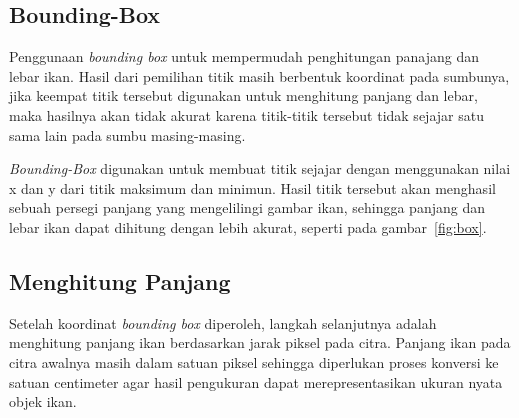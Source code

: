 
\subsection{Bounding-Box}
    Penggunaan \emph{bounding box} untuk mempermudah penghitungan panajang dan lebar ikan. Hasil dari pemilihan titik masih berbentuk koordinat pada sumbunya, 
jika keempat titik tersebut digunakan untuk menghitung panjang dan lebar, maka hasilnya akan tidak akurat karena titik-titik tersebut tidak sejajar satu sama lain pada sumbu masing-masing.

    \emph{Bounding-Box} digunakan untuk membuat titik  sejajar dengan menggunakan nilai x dan y dari titik maksimum dan minimun. Hasil titik tersebut akan menghasil sebuah persegi panjang yang mengelilingi gambar ikan, 
sehingga panjang dan lebar ikan dapat dihitung dengan lebih akurat, seperti pada gambar~\ref{fig:box}.

\subsection{Menghitung Panjang}
Setelah koordinat \emph{bounding box} diperoleh, langkah selanjutnya adalah menghitung panjang ikan berdasarkan jarak piksel pada citra. 
Panjang ikan pada citra awalnya masih dalam satuan piksel sehingga diperlukan proses konversi ke satuan centimeter agar hasil pengukuran dapat merepresentasikan ukuran nyata objek ikan.

